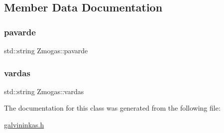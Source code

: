 \subsection{Member Data Documentation}
\mbox{\label{class_zmogas_a3b5448e7b7d3d75623a5b942b2086686}} 
\subsubsection{\texorpdfstring{pavarde}{pavarde}}
{\footnotesize\ttfamily std\+::string Zmogas\+::pavarde\hspace{0.3cm}{\ttfamily [protected]}}

\mbox{\label{class_zmogas_ac0e6b532ffc7b13d40c5b8cd28510f35}} 
\subsubsection{\texorpdfstring{vardas}{vardas}}
{\footnotesize\ttfamily std\+::string Zmogas\+::vardas\hspace{0.3cm}{\ttfamily [protected]}}



The documentation for this class was generated from the following file\+:\begin{DoxyCompactItemize}
\item 
\mbox{\hyperlink{galvininkas_8h}{galvininkas.\+h}}\end{DoxyCompactItemize}
